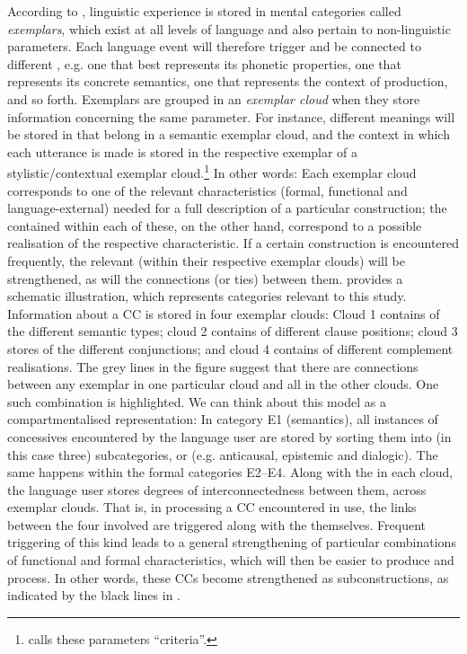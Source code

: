   According to \citet[53–54]{Bybee2013}, linguistic experience is stored in mental categories called \textit{exemplars}, which exist at all levels of language and also pertain to non-linguistic parameters. Each language event will therefore trigger and be connected to different , e.g. one that best represents its phonetic properties, one that represents its concrete semantics, one that represents the context of production, and so forth. Exemplars are grouped in an \textit{exemplar cloud} when they store information concerning the same parameter. For instance, different meanings will be stored in  that belong in a semantic exemplar cloud, and the context in which each utterance is made is stored in the respective exemplar of a stylistic/contextual exemplar cloud.\footnote{\citet{Bybee2013} calls these parameters “criteria”.} In other words: Each exemplar cloud corresponds to one of the relevant characteristics (formal, functional and language-external) needed for a full description of a particular construction; the  contained within each of these, on the other hand, correspond to a possible realisation of the respective characteristic. If a certain construction is encountered frequently, the relevant  (within their respective exemplar clouds) will be strengthened, as will the connections (or ties) between them.  provides a schematic illustration, which represents categories relevant to this study. Information about a CC is stored in four exemplar clouds: Cloud 1 contains  of the different semantic types; cloud 2 contains  of different clause positions; cloud 3 stores  of the different conjunctions; and cloud 4 contains  of different complement realisations. The grey lines in the figure suggest that there are connections between any exemplar in one particular cloud and all  in the other clouds. One such combination is highlighted. We can think about this model as a compartmentalised representation: In category E1 (semantics), all instances of concessives encountered by the language user are stored by sorting them into (in this case three) subcategories, or  (e.g. anticausal, epistemic and dialogic). The same happens within the formal categories E2–E4. Along with the  in each cloud, the language user stores degrees of interconnectedness between them, across exemplar clouds. That is, in processing a CC encountered in use, the links between the four involved  are triggered along with the  themselves. Frequent triggering of this kind leads to a general strengthening of particular combinations of functional and formal characteristics, which will then be easier to produce and process. In other words, these CCs become strengthened as subconstructions, as indicated by the black lines in .

